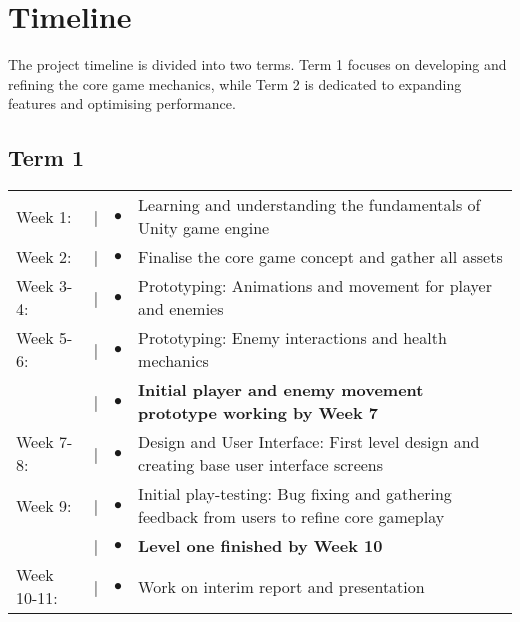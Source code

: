 \documentclass[12pt]{article}
\begin{document}
\section{Timeline}
The project timeline is divided into two terms. Term 1 focuses on developing and refining the core game mechanics, while Term 2 is dedicated to expanding features and optimising performance.

\subsection{Term 1}
\begin{tabular}{@{}p{2cm}@{}>{\raggedright\arraybackslash}p{0.5cm}@{}>{\raggedright\arraybackslash}p{0.5cm}@{}p{12cm}}
Week 1: & \textcolor{black}{|} & $\bullet$ & Learning and understanding the fundamentals of Unity game engine \\
Week 2: & \textcolor{black}{|} & $\bullet$ & Finalise the core game concept and gather all assets \\
Week 3-4: & \textcolor{black}{|} & $\bullet$ & Prototyping: Animations and movement for player and enemies\\
Week 5-6: & \textcolor{black}{|} & $\bullet$ &  Prototyping: Enemy interactions and health mechanics \\
& \textcolor{black}{|} & $\bullet$ & \textbf{Initial player and enemy movement prototype working by Week 7} \\
Week 7-8: & \textcolor{black}{|} & $\bullet$ & Design and User Interface: First level design and creating base user interface screens\\
Week 9: & \textcolor{black}{|} & $\bullet$ & Initial play-testing: Bug fixing and gathering feedback from users to refine core gameplay\\
& \textcolor{black}{|} & $\bullet$ & \textbf{Level one finished by Week 10} \\
Week 10-11: & \textcolor{black}{|} & $\bullet$ & Work on interim report and presentation \\
\end{tabular}
\end{document}
